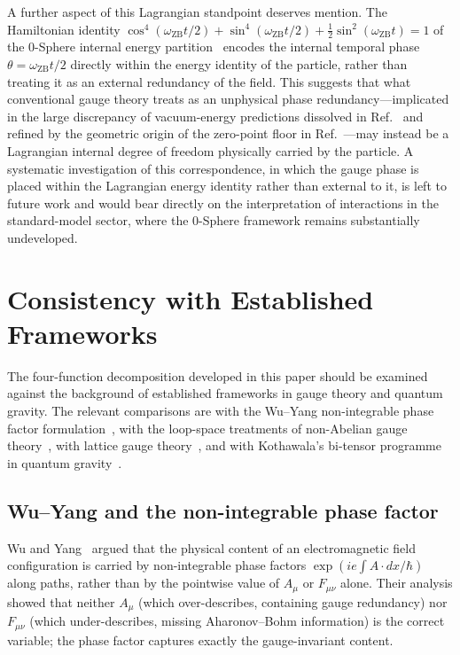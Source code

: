 \documentclass[%
 reprint, amsmath,amssymb, aps, prb, ]{revtex4-2}
\numberwithin{equation}{section}
\newcommand{\omZB}{\omega_{\text{ZB}}}
\begin{document}
A further aspect of this Lagrangian standpoint deserves mention. The Hamiltonian identity $\cos^4(\omZB t/2) + \sin^4(\omZB t/2) + \tfrac{1}{2}\sin^2(\omZB t) = 1$ of the 0-Sphere internal energy partition~\cite{hanamura01} encodes the internal temporal phase $\theta = \omZB t/2$ directly within the energy identity of the particle, rather than treating it as an external redundancy of the field. This suggests that what conventional gauge theory treats as an unphysical phase redundancy---implicated in the large discrepancy of vacuum-energy predictions dissolved in Ref.~\cite{hanamura32} and refined by the geometric origin of the zero-point floor in Ref.~\cite{hanamura46}---may instead be a Lagrangian internal degree of freedom physically carried by the particle. A systematic investigation of this correspondence, in which the gauge phase is placed within the Lagrangian energy identity rather than external to it, is left to future work and would bear directly on the interpretation of interactions in the standard-model sector, where the 0-Sphere framework remains substantially undeveloped.

\section{Consistency with Established Frameworks}
\label{sec:gauge_theory}

The four-function decomposition developed in this paper should be examined against the background of established frameworks in gauge theory and quantum gravity. The relevant comparisons are with the Wu--Yang non-integrable phase factor formulation~\cite{WuYang1975}, with the loop-space treatments of non-Abelian gauge theory~\cite{Mandelstam1968, Polyakov1979}, with lattice gauge theory~\cite{Wilson1974}, and with Kothawala's bi-tensor programme in quantum gravity~\cite{Kothawala2023}.

\subsection{Wu--Yang and the non-integrable phase factor}

Wu and Yang~\cite{WuYang1975} argued that the physical content of an electromagnetic field configuration is carried by non-integrable phase factors $\exp(ie\int A\cdot dx/\hbar)$ along paths, rather than by the pointwise value of $A_\mu$ or $F_{\mu\nu}$ alone. Their analysis showed that neither $A_\mu$ (which over-describes, containing gauge redundancy) nor $F_{\mu\nu}$ (which under-describes, missing Aharonov--Bohm information) is the correct variable; the phase factor captures exactly the gauge-invariant content.
\end{document}
